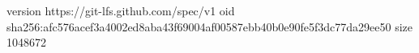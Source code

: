 version https://git-lfs.github.com/spec/v1
oid sha256:afc576acef3a4002ed8aba43f69004af00587ebb40b0e90fe5f3dc77da29ee50
size 1048672
